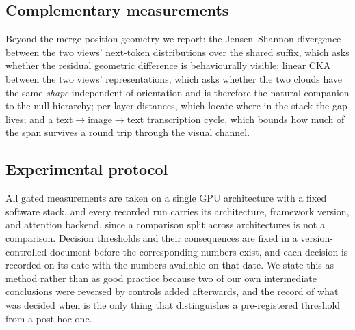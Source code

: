 \subsection{Complementary measurements}

Beyond the merge-position geometry we report: the Jensen--Shannon divergence
between the two views' next-token distributions over the shared suffix, which
asks whether the residual geometric difference is behaviourally visible; linear
CKA between the two views' representations, which asks whether the two clouds
have the same \emph{shape} independent of orientation and is therefore the
natural companion to the null hierarchy; per-layer distances, which locate where
in the stack the gap lives; and a text$\rightarrow$image$\rightarrow$text
transcription cycle, which bounds how much of the span survives a round trip
through the visual channel.

\subsection{Experimental protocol}

All gated measurements are taken on a single GPU architecture with a fixed
software stack, and every recorded run carries its architecture, framework
version, and attention backend, since a comparison split across architectures is
not a comparison. Decision thresholds and their consequences are fixed in a
version-controlled document before the corresponding numbers exist, and each
decision is recorded on its date with the numbers available on that date. We
state this as method rather than as good practice because two of our own
intermediate conclusions were reversed by controls added afterwards, and the
record of what was decided when is the only thing that distinguishes a
pre-registered threshold from a post-hoc one.
